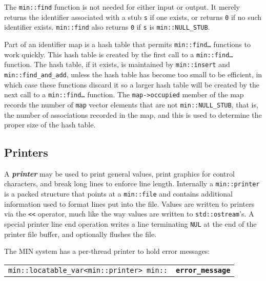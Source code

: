 \documentclass[12pt]{article}
\makeatletter
\newcommand{\key}[1]{{\bf \em #1}\index{#1}}
\newcommand{\ttindex}[1]{\index{#1@{\tt #1}}}
\newcommand{\minindex}[1]{\ttindex{min::#1}\ttindex{#1}}
\newcommand{\EOL}{\penalty \exhyphenpenalty}
\newenvironment{indpar}[1][0.3in]%
	{\begin{list}{}%
		     {\setlength{\itemsep}{0in}%
		      \setlength{\topsep}{0in}%
		      \setlength{\parsep}{1ex}%
		      \setlength{\labelwidth}{#1}%
		      \setlength{\leftmargin}{#1}%
		      \addtolength{\leftmargin}{\labelsep}}%
	 \item}%
	{\end{list}}
\newcommand{\LABEL}[1]{\label{#1}}
\newcommand{\MINKEY}[1]{{\tt \bf #1}\minindex{#1}}
\makeatother
\begin{document}
The {\tt min::find} function is not needed for either input or output.
It merely returns the identifier associated with a stub {\tt s} if one exists,
or returns {\tt 0} if no such identifier exists.
{\tt min::\EOL find} also returns
{\tt 0} if {\tt s} is {\tt min::\EOL NULL\_\EOL STUB}.

Part of an identifier map is a hash table that permits
{\tt min::\EOL find\ldots} functions to work quickly.  This
hash table is created by the first call to a
{\tt min::\EOL find\ldots} function.
The hash table, if it exists, is maintained by {\tt min::\EOL insert}
and {\tt min::\EOL find\_\EOL and\_\EOL add},
unless the hash table has become too small to be efficient, in which case
these functions discard it so a larger hash table will be created
by the next call to a {\tt min::\EOL find\ldots} function.
The {\tt map->\EOL occupied} member of the map records the number of
{\tt map} vector elements that are not {\tt min::\EOL NULL\_\EOL STUB},
that is, the number of associations recorded in the map, and this is used
to determine the proper size of the hash table.

\subsection{Printers}
\label{PRINTERS}

A \key{printer} may be used to print general values, print graphics for
control characters, and break long lines to enforce line length.
Internally a {\tt min::\EOL printer} is
a packed structure that points at a {\tt min::\EOL file} and contains
additional information used to format lines put into the file.
Values are written to printers via the \verb|<<| operator, much like the
way values are written to {\tt std::\EOL ostream}'s.  A special
printer line end operation writes a line terminating {\tt NUL}
at the end of the printer file buffer, and optionally flushes the file.

The MIN system has a per-thread printer to hold error messages:
\begin{indpar}[1em]\begin{tabular}{r@{}l}
\verb|min::locatable_var<min::printer> min::| & \MINKEY{error\_\EOL message}
\LABEL{MIN::ERROR_MESSAGE}%
\label{ERROR_MESSAGE} \\
\end{tabular}\end{indpar}
\end{document}
